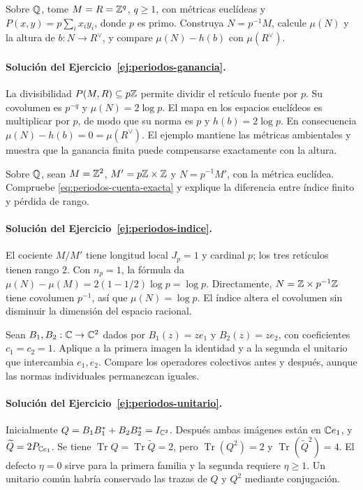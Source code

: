 \begin{ejercicio}\label{ej:periodos-ganancia}
Sobre $\mathbb{Q}$, tome $M=R=\mathbb{Z}^q$, $q\ge1$, con métricas euclídeas y
$P(x,y)=p\sum_i x_iy_i$, donde $p$ es primo.
Construya $N=p^{-1}M$, calcule $\mu(N)$ y la altura de
$b:N\to R^\vee$, y compare $\mu(N)-h(b)$ con $\mu(R^\vee)$.
\end{ejercicio}

\paragraph{Solución del Ejercicio~\ref{ej:periodos-ganancia}.}
La divisibilidad $P(M,R)\subseteq p\mathbb{Z}$ permite dividir el
retículo fuente por $p$. Su covolumen es $p^{-q}$ y
$\mu(N)=2\log p$. El mapa en los espacios euclídeos es
multiplicar por $p$, de modo que su norma es $p$ y
$h(b)=2\log p$. En consecuencia
$\mu(N)-h(b)=0=\mu(R^\vee)$. El ejemplo mantiene las métricas
ambientales y muestra que la ganancia finita puede compensarse
exactamente con la altura.

\begin{ejercicio}\label{ej:periodos-indice}
Sobre $\mathbb{Q}$, sean $M=\mathbb{Z}^2$,
$M'=p\mathbb{Z}\times\mathbb{Z}$ y $N=p^{-1}M'$, con la métrica euclídea.
Compruebe \eqref{eq:periodos-cuenta-exacta} y explique la diferencia
entre índice finito y pérdida de rango.
\end{ejercicio}

\paragraph{Solución del Ejercicio~\ref{ej:periodos-indice}.}
El cociente $M/M'$ tiene longitud local $J_p=1$ y cardinal $p$;
los tres retículos tienen rango $2$. Con $n_p=1$, la fórmula da
$\mu(N)-\mu(M)=2(1-1/2)\log p=\log p$.
Directamente, $N=\mathbb{Z}\times p^{-1}\mathbb{Z}$ tiene covolumen $p^{-1}$,
así que $\mu(N)=\log p$. El índice altera el covolumen sin
disminuir la dimensión del espacio racional.

\begin{ejercicio}\label{ej:periodos-unitario}
Sean $B_1,B_2:\mathbb{C}\to\mathbb{C}^2$ dados por $B_1(z)=ze_1$ y
$B_2(z)=ze_2$, con coeficientes $c_1=c_2=1$. Aplique a la
primera imagen la identidad y a la segunda el unitario que
intercambia $e_1,e_2$. Compare los operadores colectivos antes
y después, aunque las normas individuales permanezcan iguales.
\end{ejercicio}

\paragraph{Solución del Ejercicio~\ref{ej:periodos-unitario}.}
Inicialmente $Q=B_1B_1^*+B_2B_2^*=I_{\mathbb{C}^2}$.
Después ambas imágenes están en $\mathbb{C} e_1$, y
$\widetilde Q=2P_{\mathbb{C} e_1}$. Se tiene
$\operatorname{Tr}Q=\operatorname{Tr}\widetilde Q=2$, pero
$\operatorname{Tr}(Q^2)=2$ y
$\operatorname{Tr}(\widetilde Q^2)=4$.
El defecto $\eta=0$ sirve para la primera familia y la segunda
requiere $\eta\ge1$. Un unitario común habría conservado las
trazas de $Q$ y $Q^2$ mediante conjugación.
